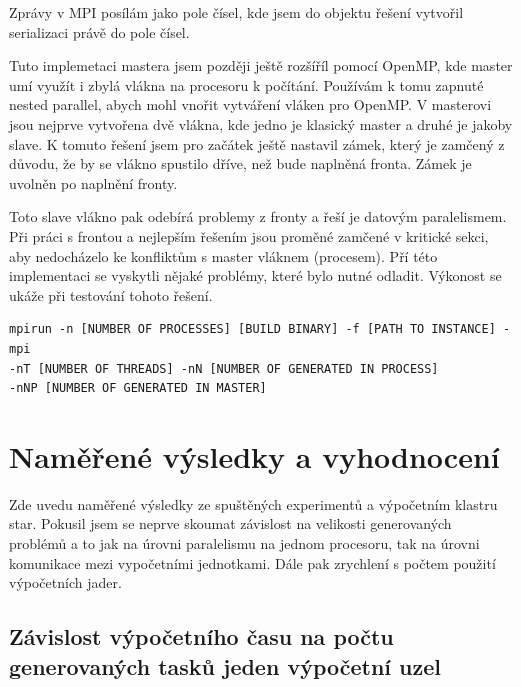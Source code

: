 \documentclass[epsf,epic,eepic,eepicemu]{article}
\begin{document}
Zprávy v MPI posílám jako pole čísel, kde jsem do objektu řešení vytvořil serializaci právě do pole čísel.

Tuto implemetaci mastera jsem později ještě rozšíříl pomocí OpenMP, kde master umí využít i zbylá vlákna na procesoru k počítání. Používám k tomu zapnuté nested parallel, abych mohl vnořit vytváření vláken pro OpenMP. V masterovi jsou nejprve vytvořena dvě vlákna, kde jedno je klasický master a druhé je jakoby slave. K tomuto řešení jsem pro začátek ještě nastavil zámek, který je zamčený z důvodu, že by se vlákno spustilo dříve, než bude naplněná fronta. Zámek je uvolněn po naplnění fronty. 

Toto slave vlákno pak odebírá problemy z fronty a řeší je datovým paralelismem. Při práci s frontou a nejlepším řešením jsou proměné zamčené v kritické sekci, aby nedocházelo ke konfliktům s master vláknem (procesem). Pří této implementaci se vyskytli nějaké problémy, které bylo nutné odladit. Výkonost se ukáže při testování tohoto řešení.

\begin{verbatim}
mpirun -n [NUMBER OF PROCESSES] [BUILD BINARY] -f [PATH TO INSTANCE] -mpi 
-nT [NUMBER OF THREADS] -nN [NUMBER OF GENERATED IN PROCESS] 
-nNP [NUMBER OF GENERATED IN MASTER]
\end{verbatim}

\section{Naměřené výsledky a vyhodnocení}
Zde uvedu naměřené výsledky ze spuštěných experimentů a výpočetním klastru star. Pokusil jsem se neprve skoumat závislost na velikosti generovaných problémů a to jak na úrovni paralelismu na jednom procesoru, tak na úrovni komunikace mezi vypočetními jednotkami. Dále pak zrychlení s počtem použití výpočetních jader.

\subsection{Závislost výpočetního času na počtu generovaných tasků jeden výpočetní uzel}
\end{document}
